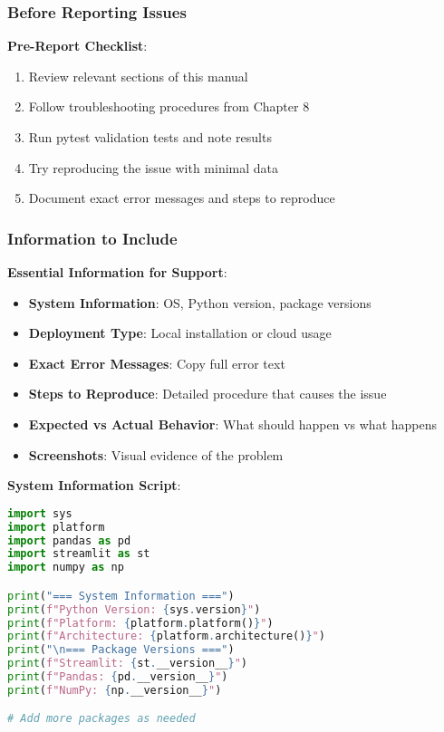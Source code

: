 \subsubsection{Before Reporting Issues}

\textbf{Pre-Report Checklist}:
\begin{enumerate}
    \item Review relevant sections of this manual
    \item Follow troubleshooting procedures from Chapter 8
    \item Run pytest validation tests and note results
    \item Try reproducing the issue with minimal data
    \item Document exact error messages and steps to reproduce
\end{enumerate}

\subsubsection{Information to Include}

\textbf{Essential Information for Support}:
\begin{itemize}
    \item \textbf{System Information}: OS, Python version, package versions
    \item \textbf{Deployment Type}: Local installation or cloud usage
    \item \textbf{Exact Error Messages}: Copy full error text
    \item \textbf{Steps to Reproduce}: Detailed procedure that causes the issue
    \item \textbf{Expected vs Actual Behavior}: What should happen vs what happens
    \item \textbf{Screenshots}: Visual evidence of the problem
\end{itemize}

\textbf{System Information Script}:
\begin{lstlisting}[language=python,basicstyle=\color{blue}]
import sys
import platform
import pandas as pd
import streamlit as st
import numpy as np

print("=== System Information ===")
print(f"Python Version: {sys.version}")
print(f"Platform: {platform.platform()}")
print(f"Architecture: {platform.architecture()}")
print("\n=== Package Versions ===")
print(f"Streamlit: {st.__version__}")
print(f"Pandas: {pd.__version__}")
print(f"NumPy: {np.__version__}")

# Add more packages as needed
\end{lstlisting}

